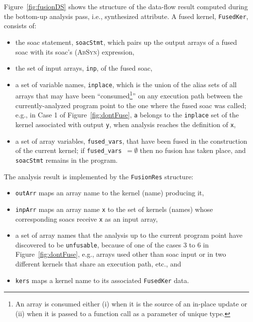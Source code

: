\documentclass{sigplanconf}  %
\newcommand{\emp}[1]{\textcolor{DikuRed}{ #1}}
\begin{document}
Figure~\ref{fig:fusionDS} shows the structure of the data-flow result
computed during the bottom-up analysis pass, i.e., synthesized attribute.  
A fused kernel, \emp{\tt FusedKer}, consists of:
\begin{itemize}
    \item the {\sc soac} statement, {\tt soacStmt}, which pairs up
            the output arrays of a fused {\sc soac} 
            with its {\sc soac}'s (\textsc{AbSyn}) expression,
    \item the set of input arrays, {\tt inp}, of the fused {\sc soac},
    \item a set of variable names, {\tt inplace}, which is
            the union of the alias sets of all arrays that may have 
            been ``consumed\footnote{
                An array is consumed either (i) when it is the 
                source of an in-place update or (ii) when it is passed 
                to a function call as a parameter of unique type. 
            }''
            on any execution path between the currently-analyzed program 
            point to the one where the fused {\sc soac} was called; e.g.,
            in \emp{Case 1} of Figure~\ref{fig:dontFuse}, {\tt a}
            belongs to the {\tt inplace} set of the kernel associated
            with output {\tt y}, when analysis reaches 
            the definition of {\tt x},
    \item a set of array variables, {\tt fused\_vars}, that have been 
            fused in the construction of the current kernel;
            if {\tt fused\_vars $=\emptyset$} then no fusion has
            taken place, and {\tt soacStmt} remains in the program.       
\end{itemize}

The analysis result is implemented by the \emp{\tt FusionRes} structure: 
\begin{itemize}
    \item {\tt outArr} maps an array name to the kernel (name) producing it, 
    \item {\tt inpArr} maps an array name {\tt x} to the set of kernels (names) 
            whose corresponding {\sc soac}s receive {\tt x} as an input array,
    \item a set of array names that the analysis up to the current 
            program point have discovered to be {\tt unfusable}, because
            of one of the \emp{cases 3 to 6} in Figure~\ref{fig:dontFuse},
            e.g., arrays used other than {\sc soac} input or
            in two different kernels that share an execution path, etc., and
    \item {\tt kers} maps a kernel name to its associated \emp{\tt FusedKer} data.
\end{itemize}
\end{document}
